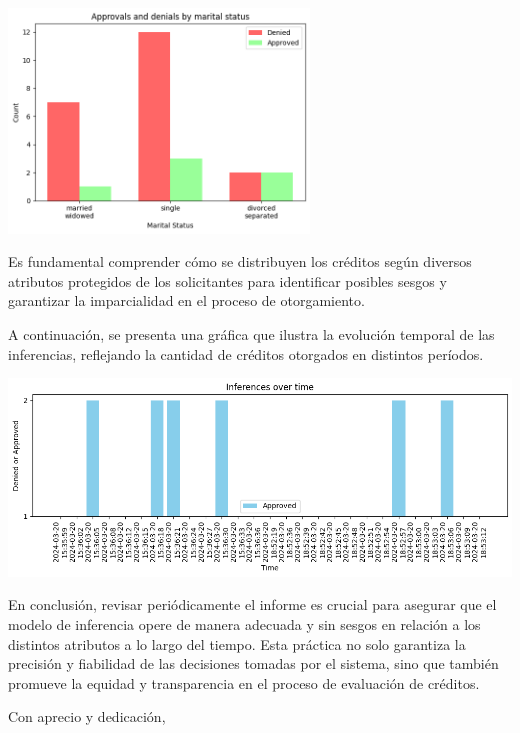 \documentclass{article}
\begin{document}
\begin{multicols}{2}
\begin{center} %
    \includegraphics[width=8cm]{tex/media/marital.png} 
\end{center}

Es fundamental comprender cómo se distribuyen los créditos según diversos atributos protegidos de los solicitantes para identificar posibles sesgos y garantizar la imparcialidad en el proceso de otorgamiento.

\end{multicols}

A continuación, se presenta una gráfica que ilustra la evolución temporal de las inferencias, reflejando la cantidad de créditos otorgados en distintos períodos.

\begin{center} %
    \includegraphics[width=16cm]{tex/media/sequence.png} 
\end{center}

En conclusión, revisar periódicamente el informe es crucial para asegurar que el modelo de inferencia opere de manera adecuada y sin sesgos en relación a los distintos atributos a lo largo del tiempo. Esta práctica no solo garantiza la precisión y fiabilidad de las decisiones tomadas por el sistema, sino que también promueve la equidad y transparencia en el proceso de evaluación de créditos.


Con aprecio y dedicación,
\end{document}
